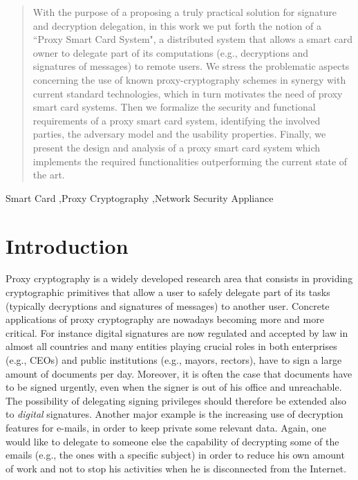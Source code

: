\documentclass[preprint,authoryear,12pt]{elsarticle}
\begin{document}
\begin{frontmatter}
\begin{abstract}
With the purpose of a proposing a truly practical solution for signature and decryption delegation, in this work we put forth the notion of a ``Proxy Smart Card System", a distributed system that allows a smart card owner to delegate part of its computations (e.g., decryptions and signatures of messages) to remote users.  We stress the problematic aspects concerning the use of known proxy-cryptography schemes in synergy with current standard technologies, which in turn motivates the need of proxy smart card systems. Then we formalize the security and functional requirements of a proxy smart card system, identifying the involved parties, the adversary model and the usability properties. Finally, we present the design and analysis of a proxy smart card system which implements the required functionalities outperforming the current state of the art.
\end{abstract}

\begin{keyword}
Smart Card  \sep Proxy Cryptography  \sep Network Security Appliance
\end{keyword}

\end{frontmatter}

\section{Introduction}
Proxy cryptography is a widely developed research area that consists in providing cryptographic primitives that allow  a user to safely delegate part of its tasks (typically decryptions and signatures of messages) to another user. Concrete applications of proxy cryptography are nowadays becoming more and more critical. For instance digital signatures are now regulated and accepted by law in almost all countries and many entities playing crucial roles in both enterprises (e.g., CEOs) and public institutions (e.g., mayors, rectors),  have to sign a large amount of documents per day.
Moreover, it is often the case that documents have to be signed urgently, even when the signer is out of his office and unreachable.
The possibility of delegating signing privileges should therefore be extended also to {\em digital} signatures. Another major example is the increasing use of decryption features for e-mails, in order to keep private some relevant data. Again, one would like to delegate to someone else the capability of decrypting some of the emails (e.g., the ones with a specific subject) in order to reduce his own amount of work and not to stop his activities when he is disconnected from the Internet.
\end{document}
